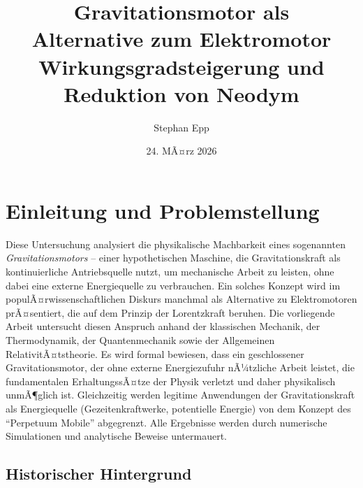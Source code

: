 ﻿\documentclass[12pt, a4paper]{report}
\title{\textbf{Gravitationsmotor als \\Alternative zum Elektromotor}\\
Wirkungsgradsteigerung und Reduktion von Neodym}
\author{Stephan Epp}
\date{24. MÃ¤rz 2026}
\theoremstyle{definition}
\theoremstyle{remark}
\begin{document}

\maketitle
\tableofcontents
\newpage

\chapter{Einleitung und Problemstellung}
\label{sec:einleitung}

Diese Untersuchung analysiert die physikalische Machbarkeit eines sogenannten
\emph{Gravitationsmotors} -- einer hypothetischen Maschine, die Gravitationskraft
als kontinuierliche Antriebsquelle nutzt, um mechanische Arbeit zu leisten,
ohne dabei eine externe Energiequelle zu verbrauchen. Ein solches Konzept wird
im populÃ¤rwissenschaftlichen Diskurs manchmal als Alternative zu Elektromotoren
prÃ¤sentiert, die auf dem Prinzip der Lorentzkraft beruhen. Die vorliegende Arbeit
untersucht diesen Anspruch anhand der klassischen Mechanik, der Thermodynamik,
der Quantenmechanik sowie der Allgemeinen RelativitÃ¤tstheorie. Es wird formal
bewiesen, dass ein geschlossener Gravitationsmotor, der ohne externe Energiezufuhr
nÃ¼tzliche Arbeit leistet, die fundamentalen ErhaltungssÃ¤tze der Physik verletzt
und daher physikalisch unmÃ¶glich ist. Gleichzeitig werden legitime Anwendungen
der Gravitationskraft als Energiequelle (Gezeitenkraftwerke, potentielle Energie)
von dem Konzept des ``Perpetuum Mobile'' abgegrenzt. Alle Ergebnisse werden durch
numerische Simulationen und analytische Beweise untermauert.

\section{Historischer Hintergrund}
\end{document}
